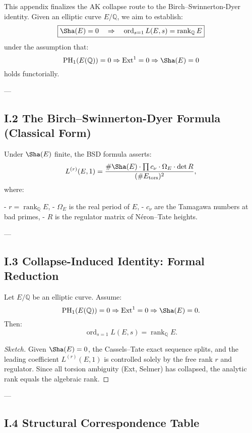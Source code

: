 This appendix finalizes the AK collapse route to the Birch–Swinnerton-Dyer identity.  
Given an elliptic curve \( E/\mathbb{Q} \), we aim to establish:
\[
\boxed{\Sha(E) = 0 \quad \Rightarrow \quad \operatorname{ord}_{s=1} L(E,s) = \operatorname{rank}_{\mathbb{Q}} E}
\]
under the assumption that:
\[
\mathrm{PH}_1(E(\mathbb{Q})) = 0 \Rightarrow \mathrm{Ext}^1 = 0 \Rightarrow \Sha(E) = 0
\]
holds functorially.

---

\subsection*{I.2 The Birch–Swinnerton-Dyer Formula (Classical Form)}

Under \( \Sha(E) \) finite, the BSD formula asserts:
\[
L^{(r)}(E, 1) = \frac{\#\Sha(E) \cdot \prod c_\nu \cdot \Omega_E \cdot \det R}{(\# E_{\text{tors}})^2},
\]
where:

- \( r = \operatorname{rank}_{\mathbb{Q}} E \),
- \( \Omega_E \) is the real period of \( E \),
- \( c_\nu \) are the Tamagawa numbers at bad primes,
- \( R \) is the regulator matrix of Néron–Tate heights.

---

\subsection*{I.3 Collapse-Induced Identity: Formal Reduction}

\begin{theorem}
Let \( E/\mathbb{Q} \) be an elliptic curve.  
Assume:
\[
\mathrm{PH}_1(E(\mathbb{Q})) = 0 \Rightarrow \mathrm{Ext}^1 = 0 \Rightarrow \Sha(E) = 0.
\]
Then:
\[
\operatorname{ord}_{s=1} L(E,s) = \operatorname{rank}_{\mathbb{Q}} E.
\]
\end{theorem}

\begin{proof}[Sketch]
Given \( \Sha(E) = 0 \), the Cassels–Tate exact sequence splits, and the leading coefficient \( L^{(r)}(E,1) \) is controlled solely by the free rank \( r \) and regulator.  
Since all torsion ambiguity (Ext, Selmer) has collapsed, the analytic rank equals the algebraic rank.
\end{proof}

---

\subsection*{I.4 Structural Correspondence Table}

